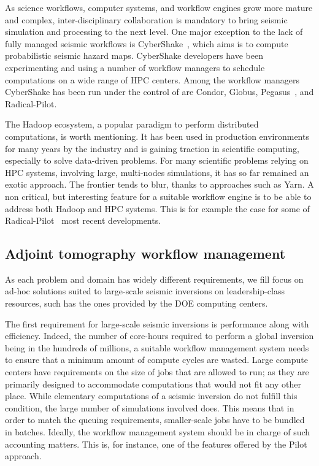 As science workflows, computer systems, and workflow engines grow more mature and
complex, inter-disciplinary collaboration is mandatory to bring seismic
simulation and processing to the next level.
One major exception to the lack of fully managed seismic workflows is
CyberShake~\cite{Graves2011}, which aims is to compute probabilistic seismic
hazard maps. CyberShake developers have been experimenting and using a number
of workflow managers to schedule computations on a wide range of HPC centers.
Among the workflow managers CyberShake has been run under the control of are
Condor, Globus, Pegasus~\cite{Callaghan2010}, and Radical-Pilot.

The Hadoop ecosystem, a popular paradigm to perform distributed computations, is
worth mentioning. It has been used in production environments for many years by
the industry and is gaining traction in scientific computing, especially to
solve data-driven problems. For many scientific problems relying on HPC systems,
involving large, multi-nodes simulations, it has so far remained an exotic
approach. The frontier tends to blur, thanks to approaches such as Yarn. A non
critical, but interesting feature for a suitable workflow engine is to be
able to address both Hadoop and HPC systems. This is for example the case for
some of Radical-Pilot~\cite{Luckow2015} most recent developments.

\subsection{Adjoint tomography workflow management}

As each problem and domain has widely different requirements, we fill focus
on ad-hoc solutions suited to large-scale seismic inversions on leadership-class
resources, such has the ones provided by the DOE computing centers.

The first requirement for large-scale seismic inversions is performance along
with efficiency. Indeed, the number of core-hours required to perform a global
inversion being in the hundreds of millions, a suitable workflow
management system needs to ensure that a minimum amount of compute cycles are
wasted. Large compute centers have requirements on the size of jobs that are
allowed to run; as they are primarily designed to accommodate computations that
would not fit any other place. While elementary computations of a seismic
inversion do not fulfill this condition, the large number of simulations involved
does. This means that in order to match the queuing requirements, smaller-scale
jobs have to be bundled in batches. Ideally, the workflow management
system should be in charge of such accounting matters. This is, for instance,
one of the features offered by the Pilot approach.

